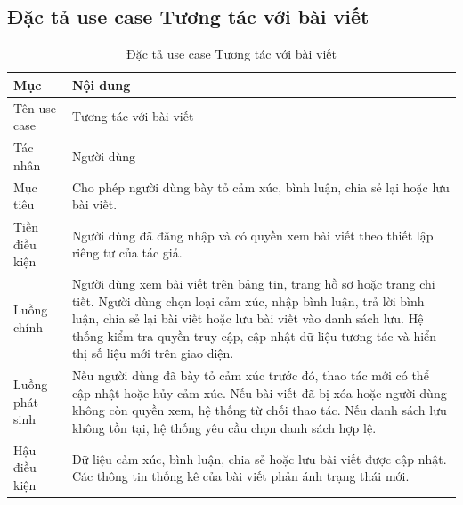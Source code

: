 \documentclass[../DoAn.tex]{subfiles}
\begin{document}
\subsection{Đặc tả use case Tương tác với bài viết}
\label{subsection:2.3.3}
\begin{table}[H]
\centering
\caption{Đặc tả use case Tương tác với bài viết}
\label{table:uc-post-interaction}
\begin{tabular}{|p{3.5cm}|p{9.5cm}|}
\hline
\textbf{Mục} & \textbf{Nội dung} \\
\hline
Tên use case & Tương tác với bài viết \\
\hline
Tác nhân & Người dùng \\
\hline
Mục tiêu & Cho phép người dùng bày tỏ cảm xúc, bình luận, chia sẻ lại hoặc lưu bài viết. \\
\hline
Tiền điều kiện & Người dùng đã đăng nhập và có quyền xem bài viết theo thiết lập riêng tư của tác giả. \\
\hline
Luồng chính & Người dùng xem bài viết trên bảng tin, trang hồ sơ hoặc trang chi tiết. Người dùng chọn loại cảm xúc, nhập bình luận, trả lời bình luận, chia sẻ lại bài viết hoặc lưu bài viết vào danh sách lưu. Hệ thống kiểm tra quyền truy cập, cập nhật dữ liệu tương tác và hiển thị số liệu mới trên giao diện. \\
\hline
Luồng phát sinh & Nếu người dùng đã bày tỏ cảm xúc trước đó, thao tác mới có thể cập nhật hoặc hủy cảm xúc. Nếu bài viết đã bị xóa hoặc người dùng không còn quyền xem, hệ thống từ chối thao tác. Nếu danh sách lưu không tồn tại, hệ thống yêu cầu chọn danh sách hợp lệ. \\
\hline
Hậu điều kiện & Dữ liệu cảm xúc, bình luận, chia sẻ hoặc lưu bài viết được cập nhật. Các thông tin thống kê của bài viết phản ánh trạng thái mới. \\
\hline
\end{tabular}
\end{table}
\end{document}

